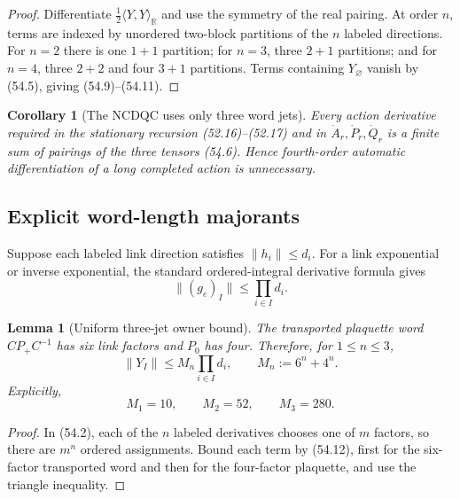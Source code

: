 \documentclass[11pt,oneside]{book}
\newtheorem{lemma}[theorem]{Lemma}
\newtheorem{corollary}[theorem]{Corollary}
\theoremstyle{definition}
\theoremstyle{remark}
\begin{document}
\begin{proof}
Differentiate \(\frac12\langle Y,Y\rangle_{\mathbb R}\) and use
the symmetry of the real pairing.  At order \(n\), terms are indexed
by unordered two-block partitions of the \(n\) labeled directions.
For \(n=2\) there is one \(1+1\) partition; for \(n=3\), three
\(2+1\) partitions; and for \(n=4\), three \(2+2\) and four
\(3+1\) partitions.  Terms containing \(Y_\varnothing\) vanish by
(54.5), giving (54.9)--(54.11).
\end{proof}

\begin{corollary}[The NCDQC uses only three word jets]
\label{cor:e8v54-three-word-jets}
Every action derivative required in the stationary recursion
(52.16)--(52.17) and in
\(\dot A_r,\dot P_r,\dot Q_r\) is a finite sum of pairings of the
three tensors (54.6).  Hence fourth-order automatic
differentiation of a long completed action is unnecessary.
\end{corollary}

\subsection{Explicit word-length majorants}

Suppose each labeled link direction satisfies
\(\|h_i\|\le d_i\).  For a link exponential or inverse exponential,
the standard ordered-integral derivative formula gives
\[
 \|(g_e)_I\|\le\prod_{i\in I}d_i.                             \tag{54.12}
\]

\begin{lemma}[Uniform three-jet owner bound]
\label{lem:e8v54-owner-bound}
The transported plaquette word \(CP_+C^{-1}\) has six link factors
and \(P_0\) has four.  Therefore, for \(1\le n\le3\),
\[
 \boxed{
 \|Y_I\|\le M_n\prod_{i\in I}d_i,\qquad
 M_n:=6^n+4^n.}                                               \tag{54.13}
\]
Explicitly,
\[
 M_1=10,\qquad M_2=52,\qquad M_3=280.                        \tag{54.14}
\]
\end{lemma}

\begin{proof}
In (54.2), each of the \(n\) labeled derivatives chooses one of
\(m\) factors, so there are \(m^n\) ordered assignments.  Bound
each term by (54.12), first for the six-factor transported word and
then for the four-factor plaquette, and use the triangle
inequality.
\end{proof}
\end{document}
